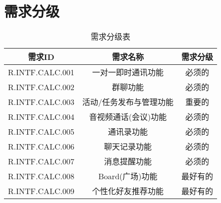 \chapter{\color{red}需求分级}
    \begin{table}[htbp]
        \centering
            \caption{\color{red}需求分级表} \label{tab:classification}
            \begin{tabular}{|c|c|c|}
                \hline%
                需求ID                & 需求名称                 & 需求分级 \\
                \hline%
                R.INTF.CALC.001      & 一对一即时通讯功能         & 必须的 \\
                \hline%
                R.INTF.CALC.002      & 群聊功能                 & 必须的 \\
                \hline%
                R.INTF.CALC.003      & 活动/任务发布与管理功能     & 重要的 \\
                \hline%
                R.INTF.CALC.004      & 音视频通话(会议)功能       & 必须的 \\
                \hline%
                R.INTF.CALC.005      & 通讯录功能                & 必须的 \\
                \hline%
                R.INTF.CALC.006      & 聊天记录功能              & 必须的 \\
                \hline%
                R.INTF.CALC.007      & 消息提醒功能              & 必须的 \\
                \hline%
                R.INTF.CALC.008      & Board(广场)功能          & 最好有的 \\
                \hline%
                R.INTF.CALC.009      & 个性化好友推荐功能         & 最好有的 \\

\end{tabular}
\end{table}
